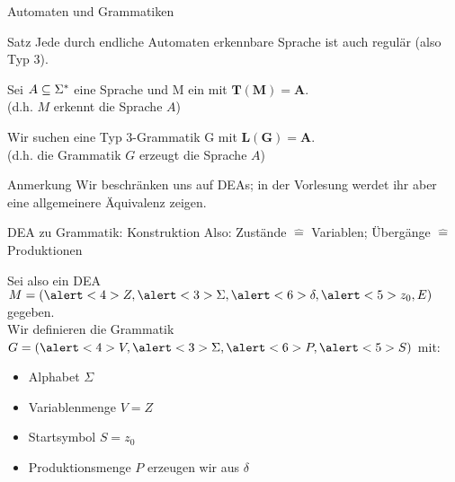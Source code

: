 \begin{frame}{Automaten und Grammatiken}
  \begin{exampleblock}{Satz}
    Jede durch  endliche Automaten erkennbare Sprache ist auch regulär (also Typ 3).
  \end{exampleblock}
  Sei \alert<2>{$A \subseteq \Sigma^{*}$} eine Sprache und \alert<2>{M ein } mit \alert<2-3>{$\mathbf{T(M) = A}$}.\\
  (d.h. $M$ erkennt die Sprache $A$) \\
  \vspace{.3cm} %

  Wir suchen eine \alert<4>{Typ 3-Grammatik G} mit \alert<4-5>{$\mathbf{L(G) = A}$}.\\
  (d.h. die Grammatik $G$ erzeugt die Sprache $A$)
  \vspace{.3cm} %

  \begin{alertblock}{Anmerkung}
    Wir beschränken uns auf DEAs; in der Vorlesung werdet ihr aber eine allgemeinere Äquivalenz zeigen.
  \end{alertblock}
\end{frame}

\begin{frame}{DEA zu Grammatik: Konstruktion}
  Also: \alert<4-5>{Zustände $\hat{=}$ Variablen}; \alert<6>{Übergänge $\hat{=}$ Produktionen}

  Sei also ein \alert<2>{DEA $M = (\alert<4>{Z}, \alert<3>{\Sigma}, \alert<6>{\delta}, \alert<5>{z_0}, E)$} gegeben. \\
    Wir definieren die \alert<2>{Grammatik $G = (\alert<4>{V}, \alert<3>{\Sigma}, \alert<6>{P}, \alert<5>{S})$} mit:
  \begin{itemize}
    \item<3- | alert@3> Alphabet $\Sigma$
    \item<4- | alert@4> Variablenmenge $V = Z$
    \item<5- | alert@5> Startsymbol $S = z_0$
    \item<6- | alert@6> Produktionsmenge $P$ erzeugen wir aus $\delta$
  \end{itemize}
\end{frame}

